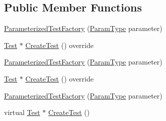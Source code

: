 \subsection*{Public Member Functions}
\begin{DoxyCompactItemize}
\item 
\mbox{\hyperlink{classtesting_1_1internal_1_1_parameterized_test_factory_a82d78356cd402224255edec760a048fb}{Parameterized\+Test\+Factory}} (\mbox{\hyperlink{classtesting_1_1internal_1_1_parameterized_test_factory_ad9a27b8e1a83de2f1687625bccff460d}{Param\+Type}} parameter)
\item 
\mbox{\hyperlink{classtesting_1_1_test}{Test}} $\ast$ \mbox{\hyperlink{classtesting_1_1internal_1_1_parameterized_test_factory_a36d962674d7bf845398637338b9f75cb}{Create\+Test}} () override
\item 
\mbox{\hyperlink{classtesting_1_1internal_1_1_parameterized_test_factory_a82d78356cd402224255edec760a048fb}{Parameterized\+Test\+Factory}} (\mbox{\hyperlink{classtesting_1_1internal_1_1_parameterized_test_factory_ad9a27b8e1a83de2f1687625bccff460d}{Param\+Type}} parameter)
\item 
\mbox{\hyperlink{classtesting_1_1_test}{Test}} $\ast$ \mbox{\hyperlink{classtesting_1_1internal_1_1_parameterized_test_factory_a36d962674d7bf845398637338b9f75cb}{Create\+Test}} () override
\item 
\mbox{\hyperlink{classtesting_1_1internal_1_1_parameterized_test_factory_a82d78356cd402224255edec760a048fb}{Parameterized\+Test\+Factory}} (\mbox{\hyperlink{classtesting_1_1internal_1_1_parameterized_test_factory_ad9a27b8e1a83de2f1687625bccff460d}{Param\+Type}} parameter)
\item 
virtual \mbox{\hyperlink{classtesting_1_1_test}{Test}} $\ast$ \mbox{\hyperlink{classtesting_1_1internal_1_1_parameterized_test_factory_ae17e73e91f7fd5d49ca238c005ef4960}{Create\+Test}} ()
\end{DoxyCompactItemize}
